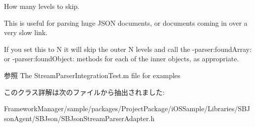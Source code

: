 How many levels to skip. 

This is useful for parsing huge J\+S\+O\+N documents, or documents coming in over a very slow link.

If you set this to N it will skip the outer N levels and call the -\/parser\+:found\+Array\+: or -\/parser\+:found\+Object\+: methods for each of the inner objects, as appropriate.

\begin{DoxySeeAlso}{参照}
The Stream\+Parser\+Integration\+Test.\+m file for examples 
\end{DoxySeeAlso}


このクラス詳解は次のファイルから抽出されました\+:\begin{DoxyCompactItemize}
\item 
Framework\+Manager/sample/packages/\+Project\+Package/i\+O\+S\+Sample/\+Libraries/\+S\+B\+Json\+Agent/\+S\+B\+Json/S\+B\+Json\+Stream\+Parser\+Adapter.\+h\end{DoxyCompactItemize}
